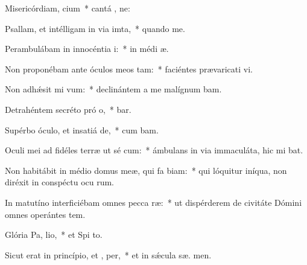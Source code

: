 \item Misericórdiam,  cium~* cantá , ne:
\item Psallam, et intélligam in via imta,~* quando   me.
\item Perambulábam in innocéntia  i:~* in médi  æ.
\item Non proponébam ante óculos meos  tam:~* faciéntes prævaricati vi.
\item Non adhǽsit mi  vum:~* declinántem a me malígnum  bam.
\item Detrahéntem secréto pró o,~*  bar.
\item Supérbo óculo, et insatiá de,~* cum   bam.
\item Oculi mei ad fidéles terræ ut sé cum:~* ámbulans in via immaculáta, hic mi bat.
\item Non habitábit in médio domus meæ, qui fa biam:~* qui lóquitur iníqua, non diréxit in conspéctu ocu rum.
\item In matutíno interficiébam omnes pecca ræ:~* ut dispérderem de civitáte Dómini omnes operántes tem.
\item Glória Pa,  lio,~* et Spi to.
\item Sicut erat in princípio, et ,  per,~* et in sǽcula sæ. men.
